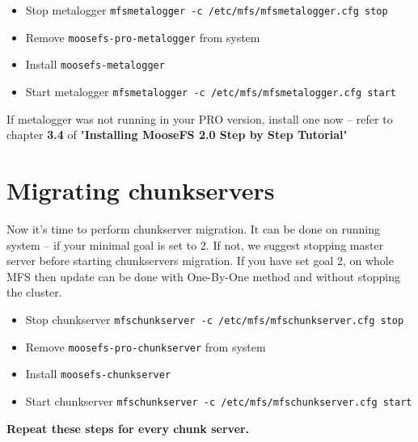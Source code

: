 \documentclass[a4paper,11pt,english]{report}
\def\code#1{\texttt{#1}}
\begin{document}
		\begin{itemize}
			\item Stop metalogger \code{mfsmetalogger -c /etc/mfs/mfsmetalogger.cfg stop}
			\item Remove \code{moosefs-pro-metalogger} from system
			\item Install \code{moosefs-metalogger}
			\item Start metalogger \code{mfsmetalogger -c /etc/mfs/mfsmetalogger.cfg start}
		\end{itemize}
		
		If metalogger was not running in your PRO version, install one now -- refer to chapter \textbf{3.4} of "\textbf{Installing MooseFS 2.0
Step by Step Tutorial}" 
		
		\section{Migrating chunkservers}
		Now it's time to perform chunkserver migration. It can be done on running system -- if your minimal goal is set to 2. If not, we suggest stopping master server before starting chunkservers migration. If you have set goal 2, on whole MFS then update can be done with One-By-One method and without stopping the cluster.
		\begin{itemize}
		\item Stop chunkserver \code{mfschunkserver -c /etc/mfs/mfschunkserver.cfg stop}
		\item Remove \code{moosefs-pro-chunkserver} from system
		\item Install \code{moosefs-chunkserver}
		\item Start chunkserver \code{mfschunkserver -c /etc/mfs/mfschunkserver.cfg start}
		\end{itemize}
		
		\textbf{Repeat these steps for every chunk server.}
		
\end{document}
